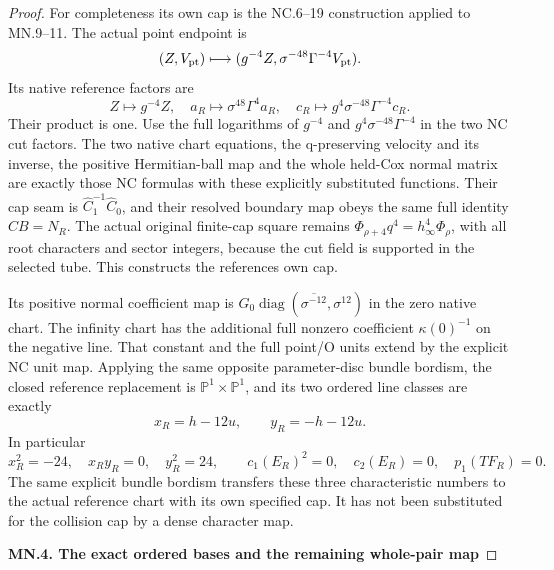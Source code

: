 \begin{proof}
For completeness its own cap is the NC.6--19 construction applied
to MN.9--11. The actual point endpoint is
\[
 (Z,V_{\rm pt})\longmapsto
        (g^{-4}Z,\sigma^{-48}\Gamma^{-4}V_{\rm pt}).
\]
Its native reference factors are
\[
 Z\mapsto g^{-4}Z,\quad
 a_R\mapsto\sigma^{48}\Gamma^4a_R,\quad
 c_R\mapsto g^4\sigma^{-48}\Gamma^{-4}c_R.
 \tag{MN.12}
\]
Their product is one. Use the full logarithms of
\(g^{-4}\) and \(g^4\sigma^{-48}\Gamma^{-4}\) in the two
NC cut factors. The two native chart equations, the q-preserving
velocity and its inverse, the positive Hermitian-ball map and the
whole held-Cox normal matrix are exactly those NC formulas with
these explicitly substituted functions. Their cap seam is
\(\widehat C_1^{-1}\widehat C_0\), and their resolved boundary
map obeys the same full identity \(\widehat C B=N_R\).
The actual original finite-cap square remains
\(\Phi_{\rho+4}q^4=h_\infty^4\Phi_\rho\), with all root
characters and sector integers, because the cut field is supported
in the selected tube. This constructs the reference\textquotesingle s own cap.

Its positive normal coefficient map is
\(G_0\operatorname{diag}(\overline{\sigma^{-12}},\sigma^{12})\)
in the zero native chart. The infinity chart has the additional
full nonzero coefficient \(\kappa(0)^{-1}\) on the negative line.
That constant and the full point/O units extend by the explicit NC
unit map. Applying the same opposite parameter-disc bundle bordism,
the closed reference replacement is
\(\mathbb P^1\times\mathbb P^1\), and its two ordered line
classes are exactly
\[
                    x_R=h-12u,\qquad y_R=-h-12u.
 \tag{MN.13}
\]
In particular
\[
 x_R^2=-24,\quad x_Ry_R=0,\quad y_R^2=24,\qquad
 c_1(E_R)^2=0,\quad c_2(E_R)=0,\quad p_1(TF_R)=0.
 \tag{MN.14}
\]
The same explicit bundle bordism transfers these three characteristic
numbers to the actual reference chart with its own specified cap. It has not been substituted for the collision
cap by a dense character map.

\par

\medskip\noindent\textbf{MN.4. The exact ordered bases and the remaining whole-pair map}

\par\nobreak


\end{proof}
